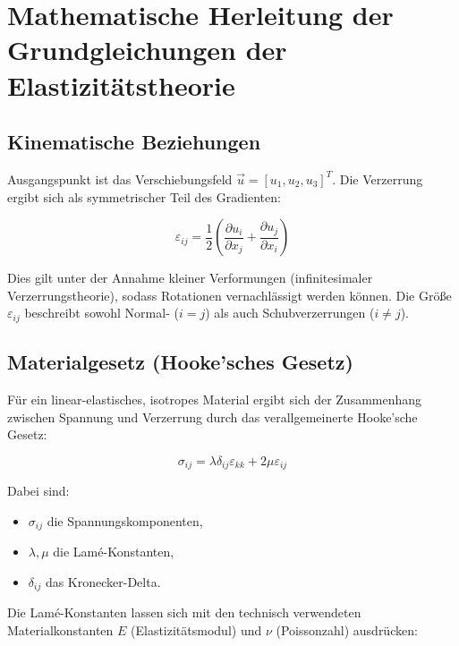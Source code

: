 %
%
%
%
\section{Mathematische Herleitung der Grundgleichungen der Elastizitätstheorie}
\label{elastomechanik:section:herleitung}

\subsection{Kinematische Beziehungen}

Ausgangspunkt ist das Verschiebungsfeld $\vec{u} = [u_1, u_2, u_3]^T$. Die Verzerrung ergibt sich als symmetrischer Teil des Gradienten:

\begin{equation}
	\varepsilon_{ij} = \frac{1}{2} \left( \frac{\partial u_i}{\partial x_j} + \frac{\partial u_j}{\partial x_i} \right)
\end{equation}

Dies gilt unter der Annahme kleiner Verformungen (infinitesimaler Verzerrungstheorie), sodass Rotationen vernachlässigt werden können. Die Größe $\varepsilon_{ij}$ beschreibt sowohl Normal- ($i = j$) als auch Schubverzerrungen ($i \ne j$).

\subsection{Materialgesetz (Hooke’sches Gesetz)}

Für ein linear-elastisches, isotropes Material ergibt sich der Zusammenhang zwischen Spannung und Verzerrung durch das verallgemeinerte Hooke’sche Gesetz:

\begin{equation}
	\sigma_{ij} = \lambda \delta_{ij} \varepsilon_{kk} + 2\mu \varepsilon_{ij}
\end{equation}

Dabei sind:
\begin{itemize}
	\item $\sigma_{ij}$ die Spannungskomponenten,
	\item $\lambda, \mu$ die Lamé-Konstanten,
	\item $\delta_{ij}$ das Kronecker-Delta.
\end{itemize}

Die Lamé-Konstanten lassen sich mit den technisch verwendeten Materialkonstanten $E$ (Elastizitätsmodul) und $\nu$ (Poissonzahl) ausdrücken:

